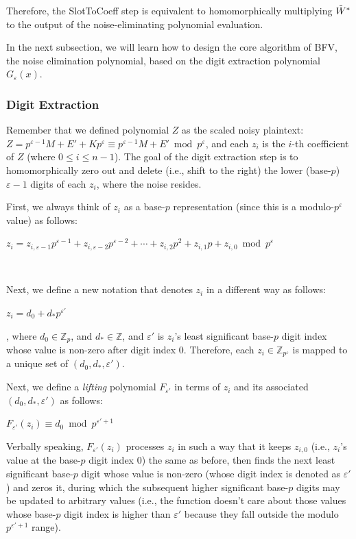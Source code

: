 Therefore, the \textsf{SlotToCoeff} step is equivalent to homomorphically multiplying $\tilde{W}^*$ to the output of the noise-eliminating polynomial evaluation.  

In the next subsection, we will learn how to design the core algorithm of BFV, the noise elimination polynomial, based on the digit extraction polynomial $G_\varepsilon(x)$. 


\subsubsection{Digit Extraction}
\label{subsubsec:bfv-bootstrapping-digit-extraction}


Remember that we defined polynomial $Z$ as the scaled noisy plaintext: $Z = p^{\varepsilon-1}M + E' + Kp^\varepsilon \equiv p^{\varepsilon-1}M + E' \bmod p^\varepsilon$, and each $z_i$ is the $i$-th coefficient of $Z$ (where $0 \leq i \leq n -1$). The goal of the digit extraction step is to homomorphically zero out and delete (i.e., shift to the right) the lower (base-$p$) $\varepsilon-1$  digits of each $z_i$, where the noise resides.%

First, we always think of $z_i$ as a base-$p$ representation (since this is a modulo-$p^\varepsilon$ value) as follows:

$z_i = z_{i, \varepsilon-1}p^{\varepsilon-1} + z_{i, \varepsilon-2}p^{\varepsilon-2} + \cdots + z_{i, 2}p^2 + z_{i, 1}p + z_{i, 0} \bmod p^\varepsilon$

$ $

Next, we define a new notation that denotes $z_i$ in a different way as follows: 

$z_i = d_0 + d_*p^{\varepsilon'}$

, where $d_0 \in \mathbb{Z}_p$, and $d_* \in \mathbb{Z}$, and $\varepsilon'$ is $z_i$'s least significant base-$p$ digit index whose value is non-zero after digit index 0. Therefore, each $z_i \in \mathbb{Z}_{p^\varepsilon}$ is mapped to a unique set of $(d_0, d_*, \varepsilon')$. 


Next, we define a \textit{lifting} polynomial $F_{\varepsilon'}$ in terms of $z_i$ and its associated $(d_0, d_*, \varepsilon')$ as follows:

$F_{\varepsilon'}(z_i) \equiv d_0 \bmod p^{\varepsilon'+1}$

Verbally speaking, $F_{\varepsilon'}(z_i)$ processes $z_i$ in such a way that it keeps $z_{i,0}$ (i.e., $z_{i}$'s value at the base-$p$ digit index 0) the same as before, then finds the next least significant base-$p$ digit whose value is non-zero (whose digit index is denoted as $\varepsilon'$) and zeros it, during which the subsequent higher significant base-$p$ digits may be updated to arbitrary values (i.e., the function doesn't care about those values whose base-$p$ digit index is higher than $\varepsilon'$ because they fall outside the modulo $p^{\varepsilon' + 1}$ range). 

